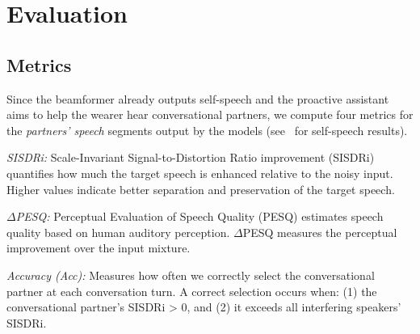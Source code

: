 \section{Evaluation}



\subsection{Metrics}\label{sec:metrics}

Since the beamformer already outputs self-speech and the proactive assistant aims to help the wearer hear conversational partners, we compute four metrics for the {\it partners' speech} segments output by the models (see~  for self-speech results).


\squishlist
\item {\it SISDRi:} Scale-Invariant Signal-to-Distortion Ratio improvement (SISDRi) quantifies how much the target speech is enhanced relative to the noisy input. Higher values indicate better separation and preservation of the target speech.

\item {\it $\Delta$PESQ: } Perceptual Evaluation of Speech Quality (PESQ) estimates speech quality based on human auditory perception. $\Delta$PESQ measures the perceptual improvement over the input mixture.

\item {\it Accuracy (Acc):} Measures how often we correctly select the conversational partner at each conversation turn. A correct selection occurs when: (1) the conversational partner's  SISDRi > 0, and (2) it exceeds all interfering speakers' SISDRi.



